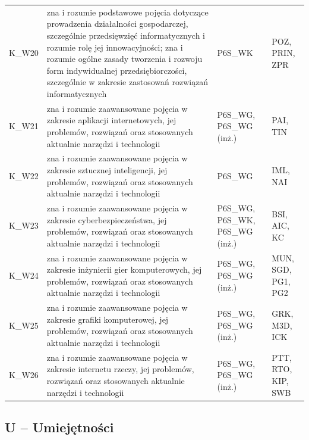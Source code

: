 \documentclass[12pt,a4paper]{article}
\begin{document}
{\begin{longtable}{m{1cm}m{8.8cm}m{2.1cm}m{2.5cm}}
\rowcolor{tableRowAlt} K\_W20 & zna i rozumie podstawowe pojęcia dotyczące prowadzenia działalności gospodarczej, szczególnie przedsięwzięć informatycznych i rozumie rolę jej innowacyjności; zna i rozumie ogólne zasady tworzenia i rozwoju form indywidualnej przedsiębiorczości, szczególnie w zakresie zastosowań rozwiązań informatycznych & {\scriptsize P6S\_WK} & {\scriptsize POZ, PRIN, ZPR} \\
\rowcolor{tableRowLight} K\_W21 & zna i rozumie zaawansowane pojęcia w zakresie aplikacji internetowych, jej problemów, rozwiązań oraz stosowanych aktualnie narzędzi i technologii & {\scriptsize P6S\_WG, P6S\_WG {\scriptsize (inż.)}} & {\scriptsize PAI, TIN} \\
\rowcolor{tableRowAlt} K\_W22 & zna i rozumie zaawansowane pojęcia w zakresie sztucznej inteligencji, jej problemów, rozwiązań oraz stosowanych aktualnie narzędzi i technologii & {\scriptsize P6S\_WG} & {\scriptsize IML, NAI} \\
\rowcolor{tableRowLight} K\_W23 & zna i rozumie zaawansowane pojęcia w zakresie cyberbezpieczeństwa, jej problemów, rozwiązań oraz stosowanych aktualnie narzędzi i technologii & {\scriptsize P6S\_WG, P6S\_WK, P6S\_WG {\scriptsize (inż.)}} & {\scriptsize BSI, AIC, KC} \\
\rowcolor{tableRowAlt} K\_W24 & zna i rozumie zaawansowane pojęcia w zakresie inżynierii gier komputerowych, jej problemów, rozwiązań oraz stosowanych aktualnie narzędzi i technologii & {\scriptsize P6S\_WG, P6S\_WG {\scriptsize (inż.)}} & {\scriptsize MUN, SGD, PG1, PG2} \\
\rowcolor{tableRowLight} K\_W25 & zna i rozumie zaawansowane pojęcia w zakresie grafiki komputerowej, jej problemów, rozwiązań oraz stosowanych aktualnie narzędzi i technologii & {\scriptsize P6S\_WG, P6S\_WG {\scriptsize (inż.)}} & {\scriptsize GRK, M3D, ICK} \\
\rowcolor{tableRowAlt} K\_W26 & zna i rozumie zaawansowane pojęcia w zakresie internetu rzeczy, jej problemów, rozwiązań oraz stosowanych aktualnie narzędzi i technologii & {\scriptsize P6S\_WG, P6S\_WG {\scriptsize (inż.)}} & {\scriptsize PTT, RTO, KIP, SWB} \\
\bottomrule
\end{longtable}}

\subsection*{U -- Umiejętności}
\end{document}
